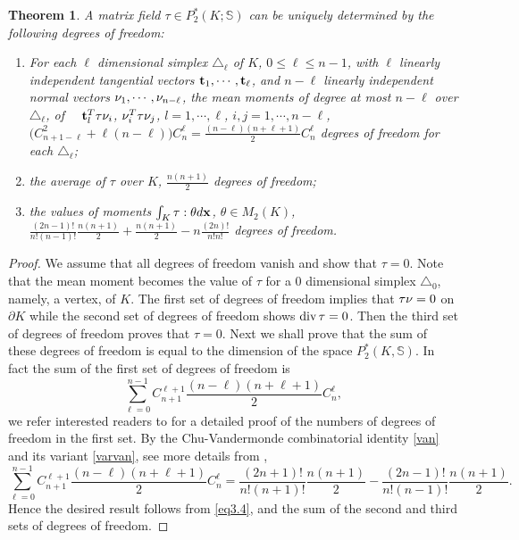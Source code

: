 \documentclass{amsart}
\newtheorem{theorem}{Theorem}[section]
\numberwithin{table}{section}
\numberwithin{figure}{section}
\begin{document}
\begin{theorem}\label{theorem3.1} A  matrix field  $\tau\in P_2^\ast(K; \mathbb{S})$ can be uniquely determined by the following degrees of
 freedom:
\begin{enumerate}
 \item For each $\ell$ dimensional simplex $\triangle_\ell$ of $K$, $0\leq \ell\leq n-1$,  with $\ell$ linearly independent tangential vectors $\mathbf{t}_1, \cdots, \mathbf{t}_\ell$, and $n-\ell$ linearly  independent normal vectors $\mathbf{\nu}_1, \cdots, \mathbf{\nu}_{n-\ell}$, the mean moments of degree at most $n-\ell$ over $\triangle_\ell$, of~~ $\mathbf{t}_l^T\tau \mathbf{\nu}_i$, $\mathbf{\nu}_i^T\tau\mathbf{\nu}_j$, $l=1, \cdots, \ell$, $i,j=1, \cdots, n-\ell$,  $\big( C_{n+1-\ell}^2+\ell (n-\ell)\big) C_{n}^\ell=\frac{(n-\ell)(n+\ell+1)}{2}C_{n}^\ell$ degrees of freedom  for each $\triangle_\ell$;
 \item the average of $\tau$ over $K$,  $\frac{n(n+1)}{2}$  degrees of freedom;
 \item the values of moments $\int_K \tau:\theta d\mathbf{x} $, $\theta \in M_2(K)$, $\frac{(2n-1)!}{n!(n-1)!}\frac{n(n+1)}{2}+\frac{n(n+1)}{2}-n\frac{(2n)!}{n!n!}$ degrees of freedom.
 \end{enumerate}
  \end{theorem}
\begin{proof} We assume that all degrees of freedom vanish and show that $\tau=0$. Note that the mean moment becomes the value of $\tau$ for a $0$ dimensional simplex $\triangle_0$, namely, a vertex, of $K$.  The  first set of degrees of freedom implies that $\tau \mathbf{\nu} =0$ on $\partial K$ while the second set of degrees of freedom shows $\operatorname{div} \tau=0$. Then the third set of
 degrees of freedom  proves that $\tau=0$. Next we shall
 prove that the sum of these  degrees of freedom is equal to the dimension of the space $P_2^\ast(K, \mathbb{S})$. In fact
  the sum of the first set of degrees of freedom is
  \begin{equation*}
  \sum\limits_{\ell=0}^{n-1}C_{n+1}^{\ell+1}\frac{(n-\ell)(n+\ell+1)}{2}C_{n}^\ell,
  \end{equation*}
  we refer interested readers to \cite[Theorem 2.1]{Hu2014} for a detailed proof of the numbers of degrees of freedom in the first set.
  By the Chu-Vandermonde combinatorial identity \eqref{van} and its variant \eqref{varvan}, see more details from \cite{Hu2014},
  \begin{equation*}
  \sum\limits_{\ell=0}^{n-1}C_{n+1}^{\ell+1}\frac{(n-\ell)(n+\ell+1)}{2}C_{n}^\ell=\frac{(2n+1)!}{n!(n+1)!}\frac{n(n+1)}{2}-
  \frac{(2n-1)!}{n!(n-1)!}\frac{n(n+1)}{2}.
  \end{equation*}
  Hence the  desired result follows from \eqref{eq3.4}, and the sum of the second and third sets of degrees of freedom.
\end{proof}
\end{document}
